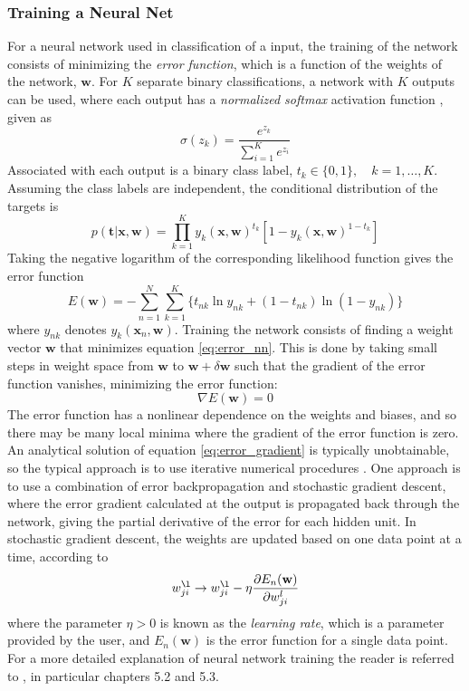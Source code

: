 \subsubsection{Training a Neural Net}
\label{section:training}
For a neural network used in classification of a input, the training of the network consists of minimizing the \textit{error function}, which is a function of the weights of the network, $\mathbf{w}$. For $K$ separate binary classifications, a network with $K$ outputs can be used, where each output has a \textit{normalized softmax} activation function \cite{machine_learning}, given as
\begin{equation}
\sigma(z_k) = \frac{e^{z_k}}{\sum_{i=1}^{K}e^{z_i}}
\end{equation} 
Associated with each output is a binary class label, $t_k\in\{0,1\},\quad k=1,\dots,K$. Assuming the class labels are independent, the conditional distribution of the targets is \cite{machine_learning}
\begin{equation}
p(\mathbf{t}|\mathbf{x},\mathbf{w})=\prod_{k=1}^{K}y_k(\mathbf{x},\mathbf{w})^{t_k}[1-y_k(\mathbf{x},\mathbf{w})^{1-t_k}]
\end{equation}
Taking the negative logarithm of the corresponding likelihood function gives the error function
\begin{equation}
\label{eq:error_nn}
E(\mathbf{w})=-\sum_{n=1}^{N}\sum_{k=1}^{K}\{t_{nk}\ln y_{nk}+(1-t_{nk})\ln(1-y_{nk})\}
\end{equation}
where $y_{nk}$ denotes $y_k(\mathbf{x}_n,\mathbf{w})$. Training the network consists of finding a weight vector $\mathbf{w}$ that minimizes equation \ref{eq:error_nn}. This is done by taking small steps in weight space from $\mathbf{w}$ to $\mathbf{w}+\delta\mathbf{w}$ such that the gradient of the error function vanishes, minimizing the error function:
\begin{equation}
\label{eq:error_gradient}
\nabla E(\mathbf{w})=0
\end{equation}
The error function has a nonlinear dependence on the weights and biases, and so there may be many local minima where the gradient of the error function is zero. An analytical solution of equation \ref{eq:error_gradient} is typically unobtainable, so the typical approach is to use iterative numerical procedures \cite{machine_learning}. One approach is to use a combination of error backpropagation and stochastic gradient descent, where the error gradient calculated at the output is propagated back through the network, giving the partial derivative of the error for each hidden unit. In stochastic gradient descent, the weights are updated based on one data point at a time, according to 
\begin{equation}
w_{ji}^{\l}\rightarrow w_{ji}^{\l}-\eta \frac{\partial E_n(\mathbf{w})}{\partial w_{ji}^{l}}
\end{equation}
where the parameter $\eta > 0$ is known as the \textit{learning rate}, which is a parameter provided by the user, and $E_n(\mathbf{w})$ is the error function for a single data point. For a more detailed explanation of neural network training the reader is referred to \cite{machine_learning}, in particular chapters 5.2 and 5.3.
